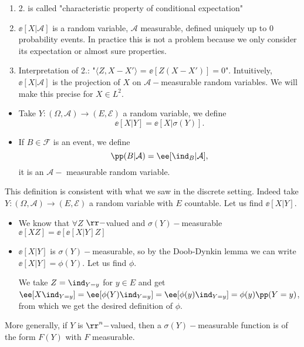 \documentclass[../main.tex]{subfiles}
\begin{document}
\begin{remark}
    \hfill
    \begin{enumerate}
      \item 2. is called "characteristic property of conditional expectation"
      \item $\ee[X | \mathcal{A}] $ is a random variable, $\mathcal{A}$ measurable, 
        defined uniquely up to $0$ probability events. In practice this is not
        a problem because we only consider its expectation or almost sure
        properties.
      \item Interpretation of 2.: "$ \langle Z, X - X' \rangle $ = $\ee[Z (X -
        X')] = 0$". Intuitively, $\ee[X | \mathcal{A}]$ is the projection of
        $X$ on $\mathcal{A}-$measurable random variables. We will make this
        precise for $X \in L^2$.
    \end{enumerate}
\end{remark}
\begin{notation}
  \hfill
  \begin{itemize}
    \item
      Take $Y\colon (\Omega, \mathcal{A}) \to (E, \mathcal{E})$ a random variable,
      we define
      \[
        \ee[X | Y] = \ee[X | \sigma(Y)] 
      .\] 
    \item If $B \in \mathcal{F}$ is an event, we define
      \[
        \pp(B | \mathcal{A}) = \ee[\ind_{B} | \mathcal{A}]
      ,\] 
    it is an $\mathcal{A}-$ measurable random variable.
  \end{itemize}
\end{notation}
\begin{remark}
    This definition is consistent with what we saw in the discrete setting.
    Indeed take $Y\colon (\Omega, \mathcal{A}) \to (E, \mathcal{E})$ a random
    variable with $E$ countable. Let us find $\ee[X | Y]$.
    \begin{itemize}
      \item We know that $\forall Z$ $\rr-$valued and $\sigma(Y)-$measurable
        $\ee[XZ] = \ee[\ee[X | Y] Z]$
      \item $\ee[X | Y]$ is $\sigma(Y)-$measurable, so by the Doob-Dynkin
        lemma we can write $\ee[X | Y] = \phi(Y)$. Let us find $\phi$.

        We take $Z = \ind_{Y = y}$ for $y \in E$ and get $\ee[X \ind_{Y = y}]
        = \ee[\phi(Y) \ind_{Y = y}] = \ee[\phi(y) \ind_{Y = y}] = \phi(y)
        \pp(Y = y)$, from which we get the desired definition of $\phi$.
    \end{itemize}
\end{remark}
\begin{remark}
  More generally, if $Y$ is $\rr^n-$valued, then a $\sigma(Y)-$measurable
  function is of the form $F(Y)$ with $F$ measurable. 
\end{remark}
\end{document}
